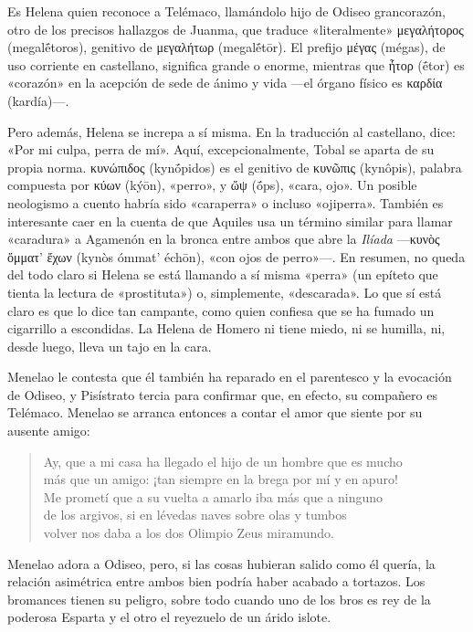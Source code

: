 \documentclass[11pt,a4paper]{article}
\newcommand{\gr}[1]{\foreignlanguage{greek}{#1}}
\begin{document}
Es Helena quien reconoce a Telémaco, llamándolo hijo de Odiseo grancorazón, otro de los precisos hallazgos de Juanma, que traduce «literalmente» \gr{μεγαλήτορος} (megalḗtoros), genitivo de \gr{μεγαλήτωρ} (megalḗtōr). El prefijo \gr{μέγας} (mégas), de uso corriente en castellano, significa grande o enorme, mientras que \gr{ἦτορ} (ḗtor) es «corazón» en la acepción de sede de ánimo y vida ---el órgano físico es \gr{καρδία} (kardía)---.


Pero además, Helena se increpa a sí misma. En la traducción al castellano, dice: «Por mi culpa, perra de mí». Aquí, excepcionalmente, Tobal se aparta de su propia norma. \gr{κυνώπιδος} (kynṓpidos) es el genitivo de \gr{κυνῶπις} (kynôpis), palabra compuesta por \gr{κύων} (kýōn), «perro», y \gr{ὤψ} (ṓps), «cara, ojo». Un posible neologismo a cuento habría sido «caraperra» o incluso «ojiperra». También es interesante caer en la cuenta de que Aquiles usa un término similar para llamar «caradura» a Agamenón en la bronca entre ambos que abre la \emph{Ilíada} ---\gr{κυνὸς ὄμματ' ἔχων} (kynòs ómmat' échōn), «con ojos de perro»---. En resumen, no queda del todo claro si Helena se está llamando a sí misma «perra» (un epíteto que tienta la lectura de «prostituta») o, simplemente, «descarada». Lo que sí está claro es que lo dice tan campante, como quien confiesa que se ha fumado un cigarrillo a escondidas. La Helena de Homero ni tiene miedo, ni se humilla, ni, desde luego, lleva un tajo en la cara.

Menelao le contesta que él también ha reparado en el parentesco y la evocación de Odiseo, y Pisístrato tercia para confirmar que, en efecto, su compañero es Telémaco. Menelao se arranca entonces a contar el amor que siente por su ausente amigo:

\begin{verse}
Ay, que a mi casa ha llegado el hijo de un hombre que es mucho\\
más que un amigo: ¡tan siempre en la brega por mí y en apuro!\\
Me prometí que a su vuelta a amarlo iba más que a ninguno\\
de los argivos, si en lévedas naves sobre olas y tumbos\\
volver nos daba a los dos Olimpio Zeus miramundo.
\end{verse}

Menelao adora a Odiseo, pero, si las cosas hubieran salido como él quería, la relación asimétrica entre ambos bien podría haber acabado a tortazos. Los bromances tienen su peligro, sobre todo cuando uno de los bros es rey de la poderosa Esparta y el otro el reyezuelo de un árido islote.
\end{document}
